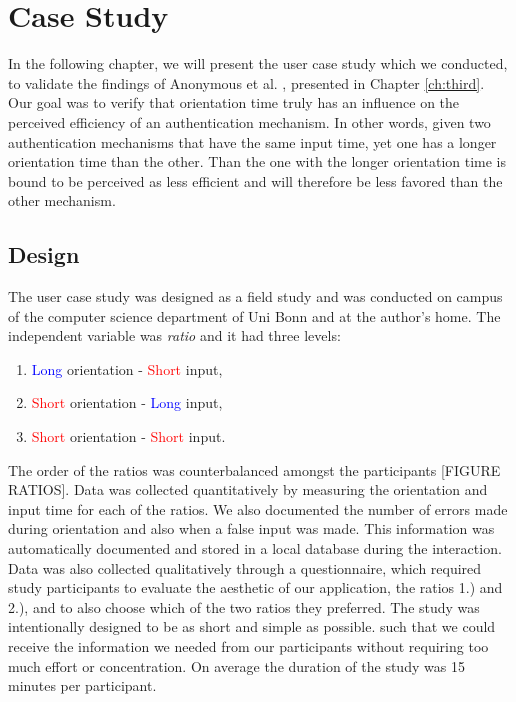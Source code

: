 
\chapter{Case Study}\label{ch:fifth}

In the following chapter, we will present the user case study which we conducted, to validate the findings of Anonymous et al. \cite{anonymous}, presented in Chapter \ref{ch:third}. Our goal was to verify that orientation time truly has an influence on the perceived efficiency of an authentication mechanism. In other words, given two authentication mechanisms that have the same input time, yet one has a longer orientation time than the other. Than the one with the longer orientation time is bound to be perceived as less efficient and will therefore be less favored than the other mechanism. 


\section{Design}

The user case study was designed as a field study and was conducted on campus of the computer science department of Uni Bonn and at the author's home. The independent variable was \textit{ratio} and it had three levels:
\begin{enumerate}
    \item \textcolor{blue}{Long} orientation - \textcolor{red}{Short} input, 
    \item \textcolor{red}{Short} orientation - \textcolor{blue}{Long} input,
    \item \textcolor{red}{Short} orientation - \textcolor{red}{Short} input.
\end{enumerate}

The order of the ratios was counterbalanced amongst the participants [FIGURE RATIOS]. Data was collected quantitatively by measuring the orientation and input time for each of the ratios. We also documented the number of errors made during orientation and also when a false input was made. This information was automatically documented and stored in a local database during the interaction. Data was also collected qualitatively through a questionnaire, which required study participants to evaluate the aesthetic of our application, the ratios 1.) and 2.), and to also choose which of the two ratios they preferred. The study was intentionally designed to be as short and simple as possible. such that we could receive the information we needed from our participants without requiring too much effort or concentration. On average the duration of the study was 15 minutes per participant. 


